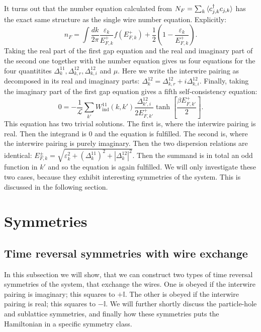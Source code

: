 It turns out that the number equation calculated from $N_F = \sum_k \braket{c^\dagger_{j,k}c_{j,k}}$ has the exact same structure as the single wire number equation. Explicitly: 
\begin{equation}
n_F = \int \frac{dk}{2\pi} \frac{\varepsilon_k}{E^{+}_{F,k}}f(E^{+}_{F,k}) + \frac{1}{2}\left(1 - \frac{\varepsilon_k}{E^{+}_{F,k}}\right). 
\label{eq.2wiresnumberequation}
\end{equation}
Taking the real part of the first gap equation and the real and imaginary part of the second one together with the number equation gives us four equations for the four quantitites $\Delta^{11}_k, \Delta^{12}_{k,r}, \Delta^{12}_{k,i} $ and $\mu$. Here we write the interwire pairing as decomposed in its real and imaginary parts: $\Delta^{12}_k = \Delta^{12}_{k,r} + i\Delta^{12}_{k,i}$. Finally, taking the imaginary part of the first gap equation gives a fifth self-consistency equation:
\begin{equation}
0 = -\frac{1}{\mathcal{L}}\sum_{k'} W_{\text{ind}}^{11}(k, k')\frac{\Delta^{12}_{k',i}}{2E^{+}_{F,k'}}\tanh\left[\frac{\beta E^{+}_{F,k'}}{2}\right].
\end{equation}
This equation has two trivial solutions. The first is, where the interwire pairing is real. Then the integrand is 0 and the equation is fulfilled. The second is, where the interwire pairing is purely imaginary. Then the two dispersion relations are identical: $E^{\pm}_{F,k} = \sqrt{\varepsilon_k^2 + (\Delta^{11}_k)^2 + |\Delta^{12}_k|^2}$. Then the summand is in total an odd function in $k'$ and so the equation is again fulfilled. We will only investigate these two cases, because they exhibit interesting symmetries of the system. This is discussed in the following section.

\section{Symmetries}
\label{sec.2wiressymmetries}
\subsection{Time reversal symmetries with wire exchange}
\label{subsec.TRwireexchange}
In this subsection we will show, that we can construct two types of time reversal symmetries of the system, that exchange the wires. One is obeyed if the interwire pairing is imaginary; this squares to $+\mathbb{I}$. The other is obeyed if the interwire pairing is real; this squares to $-\mathbb{I}$. We will further shortly discuss the particle-hole and sublattice symmetries, and finally how these symmetries puts the Hamiltonian in a specific symmetry class. 

